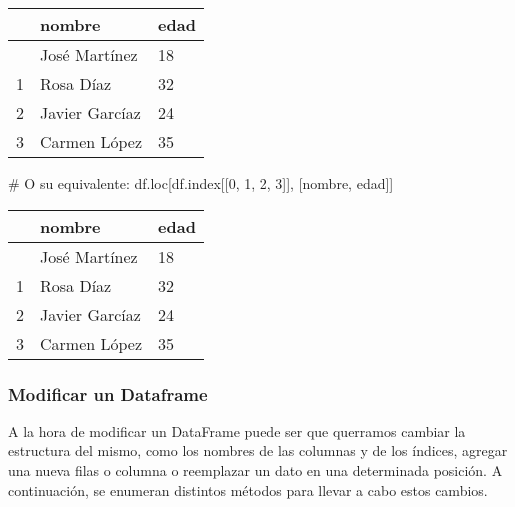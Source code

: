 \documentclass[
  letterpaper,
  DIV=11,
  numbers=noendperiod]{scrreprt}
\newenvironment{Shaded}{\begin{snugshade}}{\end{snugshade}}
\newcommand{\CommentTok}[1]{\textcolor[rgb]{0.37,0.37,0.37}{#1}}
\newcommand{\DecValTok}[1]{\textcolor[rgb]{0.68,0.00,0.00}{#1}}
\newcommand{\NormalTok}[1]{\textcolor[rgb]{0.00,0.23,0.31}{#1}}
\newcommand{\StringTok}[1]{\textcolor[rgb]{0.13,0.47,0.30}{#1}}
\begin{document}
\begin{longtable}[]{@{}lll@{}}
\toprule\noalign{}
& nombre & edad \\
\midrule\noalign{}
\endhead
\bottomrule\noalign{}
\endlastfoot
0 & José Martínez & 18 \\
1 & Rosa Díaz & 32 \\
2 & Javier Garcíaz & 24 \\
3 & Carmen López & 35 \\
\end{longtable}

\begin{Shaded}
\begin{Highlighting}[]
\CommentTok{\# O su equivalente:}
\NormalTok{df.loc[df.index[[}\DecValTok{0}\NormalTok{, }\DecValTok{1}\NormalTok{, }\DecValTok{2}\NormalTok{, }\DecValTok{3}\NormalTok{]], [}\StringTok{\textquotesingle{}nombre\textquotesingle{}}\NormalTok{, }\StringTok{\textquotesingle{}edad\textquotesingle{}}\NormalTok{]]}
\end{Highlighting}
\end{Shaded}

\begin{longtable}[]{@{}lll@{}}
\toprule\noalign{}
& nombre & edad \\
\midrule\noalign{}
\endhead
\bottomrule\noalign{}
\endlastfoot
0 & José Martínez & 18 \\
1 & Rosa Díaz & 32 \\
2 & Javier Garcíaz & 24 \\
3 & Carmen López & 35 \\
\end{longtable}

\subsubsection{Modificar un Dataframe}\label{modificar-un-dataframe}

A la hora de modificar un DataFrame puede ser que querramos cambiar la
estructura del mismo, como los nombres de las columnas y de los índices,
agregar una nueva filas o columna o reemplazar un dato en una
determinada posición. A continuación, se enumeran distintos métodos para
llevar a cabo estos cambios.
\end{document}
